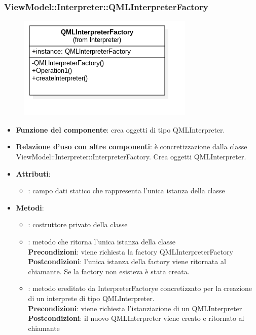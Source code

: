 \subsubsection{ViewModel::Interpreter::QMLInterpreterFactory}
\begin{figure}[h!]
\begin{center}
	\includegraphics[scale=0.4]{../images/ViewModel/Interpreter/QMLInterpreterFactory.png}
\end{center}
\end{figure}
\begin{itemize}
\item\textbf{Funzione del componente}: crea oggetti di tipo QMLInterpreter.
	\item\textbf{Relazione d'uso con altre componenti}: è concretizzazione dalla classe\\ ViewModel::Interpreter::InterpreterFactory. Crea oggetti QMLInterpreter.\\
\item\textbf{Attributi}:
	\begin{itemize}
		\item{}: campo dati statico che rappresenta l'unica istanza della classe\\
	\end{itemize}
\item\textbf{Metodi}:
	\begin{itemize}
		\item{}: costruttore privato della classe\\
		\item{}: metodo che ritorna l'unica istanza della classe\\
		\textbf{Precondizioni}: viene richiesta la factory QMLInterpreterFactory\\
		\textbf{Postcondizioni}: l'unica istanza della factory viene ritornata al chiamante. Se la factory non esisteva è stata creata.\\
		\item{}: metodo ereditato da InterpreterFactorye concretizzato per la creazione di un interprete di tipo QMLInterpreter.\\
		\textbf{Precondizioni}: viene richiesta l'istanziazione di un QMLInterpreter\\
		\textbf{Postcondizioni}: il nuovo QMLInterpreter viene creato e ritornato al chiamante\\
	\end{itemize}
\end{itemize}

